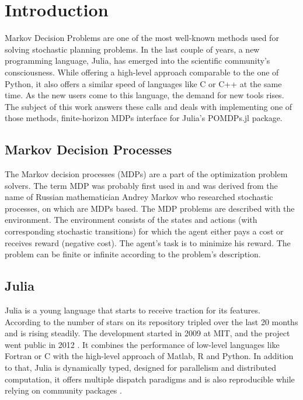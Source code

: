 

\chapter{Introduction}

Markov Decision Problems are one of the most well-known methods used for solving stochastic planning problems. In the last couple of years, a new programming language, Julia, has emerged into the scientific community's consciousness. While offering a high-level approach comparable to the one of Python, it also offers a similar speed of languages like C or C++ at the same time. As the new users come to this language, the demand for new tools rises. The subject of this work answers these calls and deals with implementing one of those methods, finite-horizon MDPs interface for Julia's POMDPs.jl package.

\section{Markov Decision Processes}
The Markov decision processes (MDPs) are a part of the optimization problem solvers.
The term MDP was probably first used in \cite{cite:1} and was derived from the name of Russian mathematician Andrey Markov who researched stochastic processes, on which are MDPs based.
The MDP problems are described with the environment. The environment consists of the states and actions (with corresponding stochastic transitions) for which the agent either pays a cost or receives reward (negative cost). The agent's task is to minimize his reward. The problem can be finite or infinite according to the problem's description.

\section{Julia}
Julia is a young language that starts to receive traction for its features. According to \cite{JuliaStars} the number of stars on its repository \cite{JuliaLang} tripled over the last 20 months and is rising steadily.
The development started in 2009 at MIT, and the project went public in 2012 \cite{JuliaHistory}. 
It combines the performance of low-level languages like Fortran or C with the high-level approach of Matlab, R and Python. In addition to that, Julia is dynamically typed, designed for parallelism and distributed computation, it offers multiple dispatch paradigms and is also reproducible while relying on community packages \cite{JuliaLangorg}.


